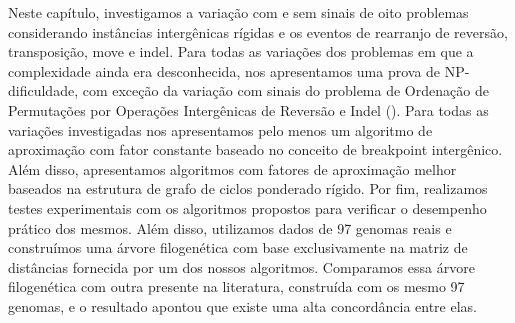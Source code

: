 Neste capítulo, investigamos a variação com e sem sinais de oito problemas considerando instâncias intergênicas rígidas e os eventos de rearranjo de reversão, transposição, move e indel. 
Para todas as variações dos problemas em que a complexidade ainda era desconhecida, nos apresentamos uma prova de NP-dificuldade, com exceção da variação com sinais do problema de Ordenação de Permutações por Operações Intergênicas de Reversão e Indel (\SbIRI). Para todas as variações investigadas nos apresentamos pelo menos um algoritmo de aproximação com fator constante baseado no conceito de breakpoint intergênico. Além disso, apresentamos algoritmos com fatores de aproximação melhor baseados na estrutura de grafo de ciclos ponderado rígido. Por fim, realizamos testes experimentais com os algoritmos propostos para verificar o desempenho prático dos mesmos. Além disso, utilizamos dados de 97 genomas reais e construímos uma árvore filogenética com base exclusivamente na matriz de distâncias fornecida por um dos nossos algoritmos. Comparamos essa árvore filogenética com outra presente na literatura, construída com os mesmo 97 genomas, e o resultado apontou que existe uma alta concordância entre elas.
